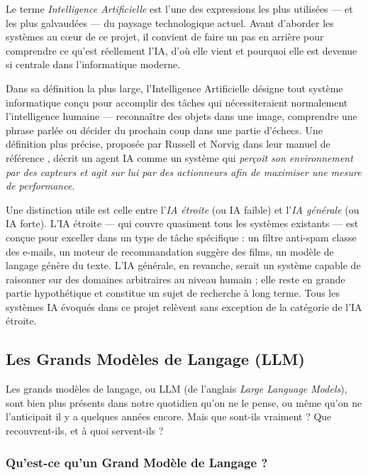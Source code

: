 \documentclass[a4paper,11pt]{article}
\begin{document}
Le terme \emph{Intelligence Artificielle} est l'une des expressions les plus
utilisées --- et les plus galvaudées --- du paysage technologique actuel.
Avant d'aborder les systèmes au c\oe{}ur de ce projet, il convient de faire
un pas en arrière pour comprendre ce qu'est réellement l'IA, d'où elle vient
et pourquoi elle est devenue si centrale dans l'informatique moderne.

Dans sa définition la plus large, l'Intelligence Artificielle désigne tout
système informatique conçu pour accomplir des tâches qui nécessiteraient
normalement l'intelligence humaine --- reconnaître des objets dans une image,
comprendre une phrase parlée ou décider du prochain coup dans une partie
d'échecs. Une définition plus précise, proposée par Russell et Norvig dans
leur manuel de référence \cite{russell2010ai}, décrit un agent IA comme un
système qui \emph{perçoit son environnement par des capteurs et agit sur lui
par des actionneurs afin de maximiser une mesure de performance}.

Une distinction utile est celle entre l'\emph{IA étroite} (ou IA faible)
et l'\emph{IA générale} (ou IA forte). L'IA étroite --- qui couvre
quasiment tous les systèmes existants --- est conçue pour exceller dans un
type de tâche spécifique : un filtre anti-spam classe des e-mails, un moteur
de recommandation suggère des films, un modèle de langage génère du texte.
L'IA générale, en revanche, serait un système capable de raisonner sur des
domaines arbitraires au niveau humain ; elle reste en grande partie
hypothétique et constitue un sujet de recherche à long terme. Tous les
systèmes IA évoqués dans ce projet relèvent sans exception de la catégorie
de l'IA étroite.

\subsection{Les Grands Modèles de Langage (LLM)}

Les grands modèles de langage, ou LLM (de l'anglais \emph{Large Language
Models}), sont bien plus présents dans notre quotidien qu'on ne le pense,
ou même qu'on ne l'anticipait il y a quelques années encore. Mais que
sont-ils vraiment ? Que recouvrent-ils, et à quoi servent-ils ?
\cite{llm_intro_placeholder}

\subsubsection{Qu'est-ce qu'un Grand Modèle de Langage ?}
\end{document}
